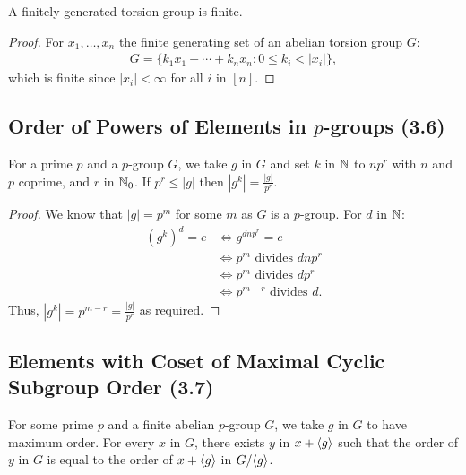 A finitely generated torsion group is finite.

\begin{proof}
    For $x_1, \ldots, x_n$ the finite generating set of an abelian torsion group $G$: 
    \begin{align*}
        G = \{k_1x_1 + \cdots + k_nx_n : 0 \leq k_i < |x_i|\},
    \end{align*} which is finite since $|x_i| < \infty$ for all $i$ in $[n]$.
\end{proof}

\subsection{Order of Powers of Elements in $p$-groups (3.6)} \label{3.6}

For a prime $p$ and a $p$-group $G$, we take $g$ in $G$ and set $k$
in $\mathbb{N}$ to $np^r$ with $n$ and $p$ coprime, and $r$ in $\mathbb{N}_0$.
If $p^r \leq |g|$ then $|g^k| = \frac{|g|}{p^r}$.

\begin{proof}
    We know that $|g| = p^m$ for some $m$ as $G$ is a $p$-group.
    For $d$ in $\mathbb{N}$: \begin{align*}
        (g^k)^d = e
        &\Longleftrightarrow g^{dnp^r} = e \\
        &\Longleftrightarrow p^m \text{ divides } dnp^r \\
        &\Longleftrightarrow p^m \text{ divides } dp^r \tag{$n$ and $p$ coprime} \\
        &\Longleftrightarrow p^{m - r} \text{ divides } d.
    \end{align*} Thus, $|g^k| = p^{m - r} = \frac{|g|}{p^r}$ as required.
\end{proof}

\subsection{Elements with Coset of Maximal Cyclic Subgroup Order (3.7)} \label{3.7}

For some prime $p$ and a finite abelian $p$-group $G$, we take $g$ in $G$
to have maximum order. For every $x$ in $G$, there exists $y$ in $x + {\langle g \rangle}$
such that the order of $y$ in $G$ is equal to the order of $x + {\langle g \rangle}$ in
$G / {\langle g \rangle}$.

